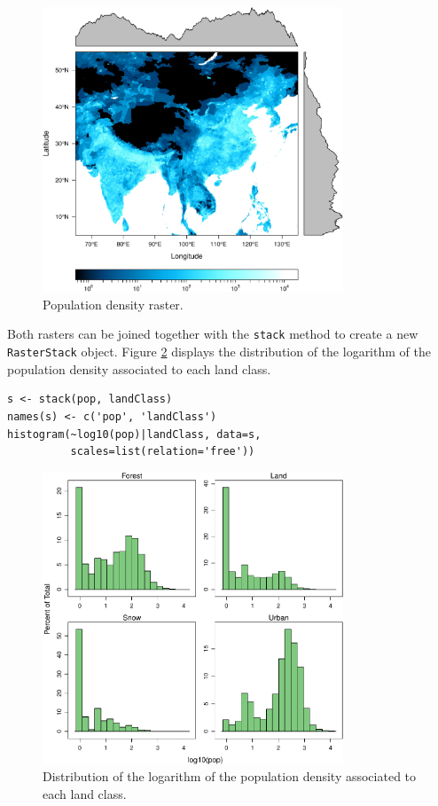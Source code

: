 \begin{figure}[h!]
\centering
\includegraphics[width=0.8\textwidth]{figs/populationNASA.pdf}
\caption{\label{fig:populationNASA}Population density raster.}
\end{figure}

Both rasters can be joined together with the \texttt{stack} method to
create a new \texttt{RasterStack} object. Figure
\ref{fig:histogramLandClass} displays the distribution of the
logarithm of the population density associated to each land class.


\lstset{language=R}
\begin{lstlisting}
s <- stack(pop, landClass)
names(s) <- c('pop', 'landClass')
histogram(~log10(pop)|landClass, data=s,
          scales=list(relation='free'))
\end{lstlisting}

\begin{figure}[h!]
\centering
\includegraphics[width=0.8\textwidth]{figs/histogramLandClass.pdf}
\caption{\label{fig:histogramLandClass}Distribution of the logarithm of the population density associated to each land class.}
\end{figure}
